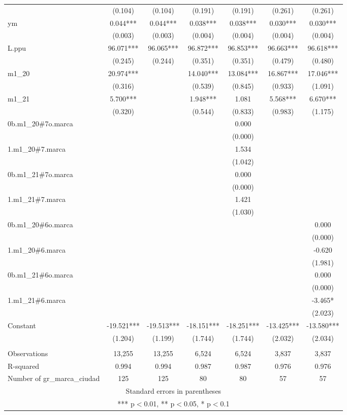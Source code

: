 \begin{tabular}{lcccccc}
 & (0.104) & (0.104) & (0.191) & (0.191) & (0.261) & (0.261) \\
ym & 0.044*** & 0.044*** & 0.038*** & 0.038*** & 0.030*** & 0.030*** \\
 & (0.003) & (0.003) & (0.004) & (0.004) & (0.004) & (0.004) \\
L.ppu & 96.071*** & 96.065*** & 96.872*** & 96.853*** & 96.663*** & 96.618*** \\
 & (0.245) & (0.244) & (0.351) & (0.351) & (0.479) & (0.480) \\
m1\_20 & 20.974*** &  & 14.040*** & 13.084*** & 16.867*** & 17.046*** \\
 & (0.316) &  & (0.539) & (0.845) & (0.933) & (1.091) \\
m1\_21 & 5.700*** &  & 1.948*** & 1.081 & 5.568*** & 6.670*** \\
 & (0.320) &  & (0.544) & (0.833) & (0.983) & (1.175) \\
0b.m1\_20\#7o.marca &  &  &  & 0.000 &  &  \\
 &  &  &  & (0.000) &  &  \\
1.m1\_20\#7.marca &  &  &  & 1.534 &  &  \\
 &  &  &  & (1.042) &  &  \\
0b.m1\_21\#7o.marca &  &  &  & 0.000 &  &  \\
 &  &  &  & (0.000) &  &  \\
1.m1\_21\#7.marca &  &  &  & 1.421 &  &  \\
 &  &  &  & (1.030) &  &  \\
0b.m1\_20\#6o.marca &  &  &  &  &  & 0.000 \\
 &  &  &  &  &  & (0.000) \\
1.m1\_20\#6.marca &  &  &  &  &  & -0.620 \\
 &  &  &  &  &  & (1.981) \\
0b.m1\_21\#6o.marca &  &  &  &  &  & 0.000 \\
 &  &  &  &  &  & (0.000) \\
1.m1\_21\#6.marca &  &  &  &  &  & -3.465* \\
 &  &  &  &  &  & (2.023) \\
Constant & -19.521*** & -19.513*** & -18.151*** & -18.251*** & -13.425*** & -13.580*** \\
 & (1.204) & (1.199) & (1.744) & (1.744) & (2.032) & (2.034) \\
 &  &  &  &  &  &  \\
Observations & 13,255 & 13,255 & 6,524 & 6,524 & 3,837 & 3,837 \\
R-squared & 0.994 & 0.994 & 0.987 & 0.987 & 0.976 & 0.976 \\
 Number of gr\_marca\_ciudad & 125 & 125 & 80 & 80 & 57 & 57 \\ \hline
\multicolumn{7}{c}{ Standard errors in parentheses} \\
\multicolumn{7}{c}{ *** p$<$0.01, ** p$<$0.05, * p$<$0.1} \\
\end{tabular}
